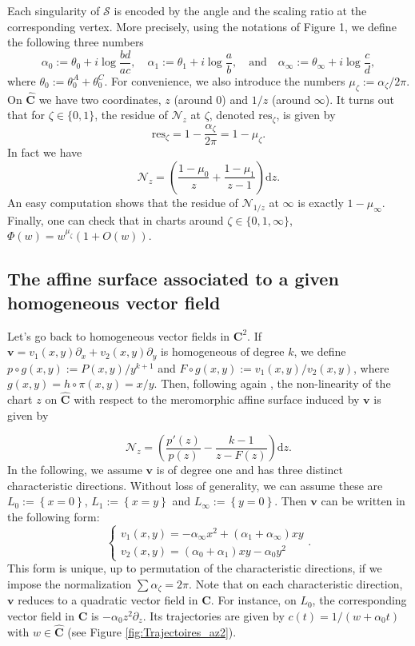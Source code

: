 \documentclass[11pt]{article}
\begin{document}
Each singularity of $\mathcal{S}$ is encoded by the angle and the scaling ratio at the corresponding vertex. More precisely, using the notations of Figure 1, we define the following three numbers
\[
\alpha_{0}:=\theta_{0}+i\log\frac{bd}{ac},\quad\alpha_{1}:=\theta_{1}+i\log\frac{a}{b},\quad\text{and}\quad\alpha_{\infty}:=\theta_{\infty}+i\log\frac{c}{d},
\]
where $\theta_{0}:=\theta_{0}^{A}+\theta_{0}^{C}$. For convenience, we also introduce the numbers $\mu_{\zeta}:=\alpha_{\zeta}/2\pi$. On $\widehat{\mathbf{C}}$ we have two coordinates, $z$ (around 0) and $1/z$ (around $\infty$). It turns out that for $\zeta\in\{0,1\}$, the residue of $\mathcal{N}_{z}$ at $\zeta$, denoted $\text{res}_{\zeta}$, is given by
\[
\text{res}_{\zeta}=1-\frac{\alpha_{\zeta}}{2\pi}=1-\mu_{\zeta}.
\]
In fact we have
\[
\mathcal{N}_{z}=\left(\frac{1-\mu_{0}}{z}+\frac{1-\mu_{1}}{z-1}\right)\text{d}z.
\]
An easy computation shows that the residue of $\mathcal{N}_{1/z}$ at $\infty$ is exactly $1-\mu_{\infty}$. Finally, one can check that in charts around $\zeta\in\{0,1,\infty\}$, $\Phi(w)=w^{\mu_{\zeta}}(1+O(w))$.

\subsection{The affine surface associated to a given homogeneous vector field}

Let's go back to homogeneous vector fields in $\mathbf{C}^{2}$. If $\mathbf{v}=v_{1}\left(x,y\right)\partial_{x}+v_{2}\left(x,y\right)\partial_{y}$ is homogeneous of degree $k$, we define $p\circ g\left(x,y\right):=P\left(x,y\right)/y^{k+1}$ and $F\circ g\left(x,y\right):=v_{1}\left(x,y\right)/v_{2}\left(x,y\right)$, where $g(x,y)=h\circ\pi(x,y)=x/y$. Then, following again \cite{BuffRaissy}, the non-linearity of the chart $z$ on $\widehat{\mathbf
C}$ with respect to the meromorphic affine surface induced by $\mathbf{v}$ is given by

\[
\mathcal{N}_{z}=\left(\frac{p'\left(z\right)}{p\left(z\right)}-\frac{k-1}{z-F\left(z\right)}\right)\text{d}z.
\]
In the following, we assume $\mathbf{v}$ is of degree one and has three distinct characteristic directions. Without loss of generality, we can assume these are $L_{0}:=\left\{x=0\right\}$, $L_{1}:=\left\{x=y\right\}$ and $L_{\infty}:=\left\{y=0\right\}$. Then $\mathbf{v}$ can be written in the following form:
\[
\left\{
\begin{array}{l}
v_{1}\left(x,y\right)=-\alpha_{\infty}x^{2}+\left(\alpha_{1}+\alpha_{\infty}\right)xy\\[3pt]
v_{2}\left(x,y\right)=\left(\alpha_{0}+\alpha_{1}\right)xy-\alpha_{0}y^{2}
\end{array}
\right.
.
\]
This form is unique, up to permutation of the characteristic directions, if we impose the normalization $\sum\alpha_{\zeta}=2\pi$. Note that on each characteristic direction, $\mathbf{v}$ reduces to a quadratic vector field in $\mathbf{C}$. For instance, on $L_{0}$, the corresponding vector field in $\mathbf{C}$ is $-\alpha_{0}z^{2}\partial_{z}$. Its trajectories are given by $c(t)=1/(w+\alpha_{0}t)$ with $w\in\widehat{\mathbf{C}}$ (see Figure \ref{fig:Trajectoires_az2}).
\end{document}
